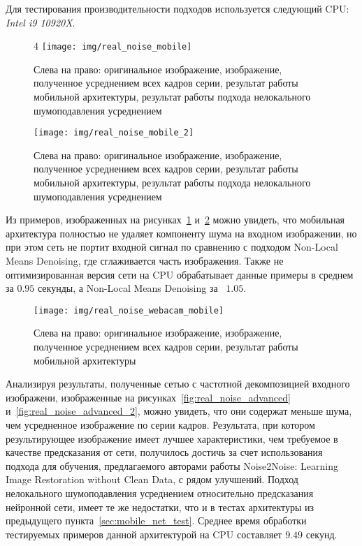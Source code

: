 \documentclass[runningheads]{llncs}
\begin{document}
Для тестирования производительности подходов используется следующий CPU: \textit{Intel i9 10920X}.

\begin{figure}4
	\centering
	\texttt{[image: img/real\_noise\_mobile]}
	\caption{Слева на право: оригинальное изображение, изображение, полученное усреднением всех кадров серии, результат работы мобильной архитектуры, результат работы подхода нелокального шумоподавления усреднением}
	\label{fig:real_noise_mobile}
\end{figure}

\begin{figure}
	\centering
	\texttt{[image: img/real\_noise\_mobile\_2]}
	\caption{Слева на право: оригинальное изображение, изображение, полученное усреднением всех кадров серии, результат работы мобильной архитектуры, результат работы подхода нелокального шумоподавления усреднением}
	\label{fig:real_noise_mobile_2}
\end{figure}

Из примеров, изображенных на рисунках~\ref{fig:real_noise_mobile} и~\ref{fig:real_noise_mobile_2} можно увидеть, что мобильная архитектура полностью не удаляет компоненту шума на входном изображении, но при этом сеть не портит входной сигнал по сравнению с подходом Non-Local Means Denoising, где сглаживается часть изображения. Также не оптимизированная версия сети на CPU обрабатывает данные примеры в среднем за $0.95$ секунды, а Non-Local Means Denoising за  $1.05$.

\begin{figure}
	\centering
	\texttt{[image: img/real\_noise\_webacam\_mobile]}
	\caption{Слева на право: оригинальное изображение, изображение, полученное усреднением всех кадров серии, результат работы мобильной архитектуры}
	\label{fig:real_noise_webacam_mobile}
\end{figure}

Анализируя результаты, полученные сетью с частотной декомпозицией входного изображени, изображенные на рисунках~\ref{fig:real_noise_advanced} и~\ref{fig:real_noise_advanced_2}, можно увидеть, что они содержат меньше шума, чем усредненное изображение по серии кадров. Результата, при котором результирующее изображение имеет лучшее характеристики, чем требуемое в качестве предсказания от сети, получилось достичь за счет использования подхода для обучения, предлагаемого авторами работы Noise2Noise: Learning Image Restoration without Clean Data, с рядом улучшений. Подход нелокального шумоподавления усреднением относительно предсказания нейронной сети, имеет те же недостатки, что и в тестах архитектуры из предыдущего пункта~\ref{sec:mobile_net_test}. Среднее время обработки тестируемых примеров данной архитектурой на CPU составляет $9.49$ секунд.
\end{document}
